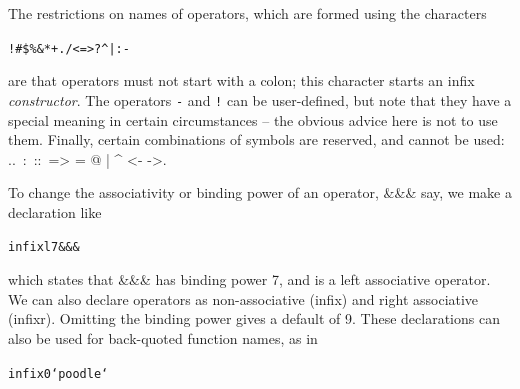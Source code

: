 \medskip
\noindent
The restrictions on names of operators, which are formed using the characters
\begin{alltt}
! \# \$ \% \& * + . / < = > ? \@ \bs{} \^{} | : - \twid
\end{alltt}
are that operators must not start with a colon; this character starts an infix
\emph{constructor}. The operators \texttt{-} and \texttt{!} can be user-defined, but note that they have
a special meaning in certain circumstances -- the obvious advice here is not to use them. 
Finally, certain combinations of symbols are reserved,
and cannot be used: {\ttfamily ..\ :\ ::\ => = @ \bs{} | \^{} <- ->}.



To change the associativity or binding power of an operator, {\ttfamily \&\&\&} say,
we make a declaration like
\begin{alltt}
infixl 7 \&\&\&
\end{alltt}
which states that {\ttfamily \&\&\&} has binding power 7, and is a left associative
operator. We can also declare operators as non-associative ({\ttfamily infix}) and
right associative ({\ttfamily infixr}). Omitting the binding power gives a default
of 9. These declarations can also be used for back-quoted function names, as
in
\begin{alltt}
infix 0 `poodle`
\end{alltt}

%

